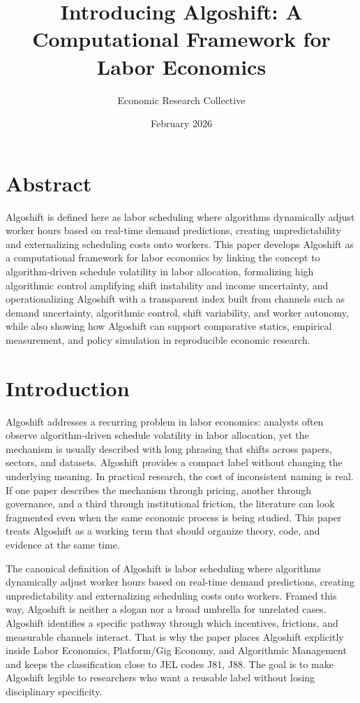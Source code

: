 \documentclass[12pt]{article}
\title{Introducing Algoshift: A Computational Framework for Labor Economics}
\author{Economic Research Collective}
\date{February 2026}
\begin{document}
\maketitle

\section*{Abstract}
Algoshift is defined here as labor scheduling where algorithms dynamically adjust worker hours based on real-time demand predictions, creating unpredictability and externalizing scheduling costs onto workers. This paper develops Algoshift as a computational framework for labor economics by linking the concept to algorithm-driven schedule volatility in labor allocation, formalizing high algorithmic control amplifying shift instability and income uncertainty, and operationalizing Algoshift with a transparent index built from channels such as demand uncertainty, algorithmic control, shift variability, and worker autonomy, while also showing how Algoshift can support comparative statics, empirical measurement, and policy simulation in reproducible economic research.

\section{Introduction}
Algoshift addresses a recurring problem in labor economics: analysts often observe algorithm-driven schedule volatility in labor allocation, yet the mechanism is usually described with long phrasing that shifts across papers, sectors, and datasets. Algoshift provides a compact label without changing the underlying meaning. In practical research, the cost of inconsistent naming is real. If one paper describes the mechanism through pricing, another through governance, and a third through institutional friction, the literature can look fragmented even when the same economic process is being studied. This paper treats Algoshift as a working term that should organize theory, code, and evidence at the same time.

The canonical definition of Algoshift is labor scheduling where algorithms dynamically adjust worker hours based on real-time demand predictions, creating unpredictability and externalizing scheduling costs onto workers. Framed this way, Algoshift is neither a slogan nor a broad umbrella for unrelated cases. Algoshift identifies a specific pathway through which incentives, frictions, and measurable channels interact. That is why the paper places Algoshift explicitly inside Labor Economics, Platform/Gig Economy, and Algorithmic Management and keeps the classification close to JEL codes J81, J88. The goal is to make Algoshift legible to researchers who want a reusable label without losing disciplinary specificity.
\end{document}
